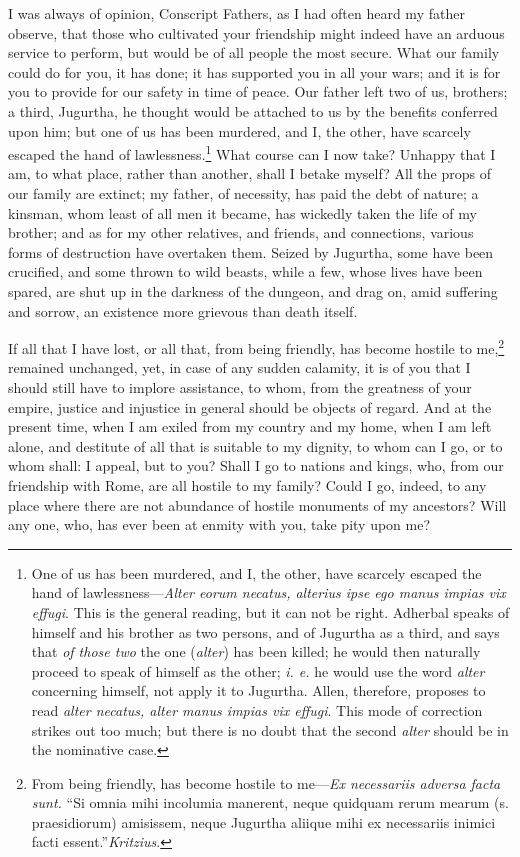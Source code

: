 I was always of opinion, Conscript Fathers, as I had often heard my
father observe, that those who cultivated your friendship might indeed
have an arduous service to perform, but would be of all people the
most secure. What our family could do for you, it has done; it has
supported you in all your wars; and it is for you to provide for our
safety in time of peace. Our father left two of us, brothers; a third,
Jugurtha, he thought would be attached to us by the benefits conferred
upon him; but one of us has been murdered, and I, the other, have
scarcely escaped the hand of lawlessness.\footnote{One of us has been murdered, and I, the other, have scarcely
escaped the hand of lawlessness—\emph{Alter eorum necatus, alterius ipse
ego manus impias vix effugi}. This is the general reading, but it can
not be right. Adherbal speaks of himself and his brother as two
persons, and of Jugurtha as a third, and says that \emph{of those two} the
one (\emph{alter}) has been killed; he would then naturally proceed to
speak of himself as the other; \emph{i. e.} he would use the word \emph{alter}
concerning himself, not apply it to Jugurtha. Allen, therefore,
proposes to read \emph{alter necatus, alter manus impias vix effugi}. This
mode of correction strikes out too much; but there is no doubt that
the second \emph{alter} should be in the nominative case.} What course can I now
take? Unhappy that I am, to what place, rather than another, shall I
betake myself? All the props of our family are extinct; my father, of
necessity, has paid the debt of nature; a kinsman, whom least of all
men it became, has wickedly taken the life of my brother; and as for
my other relatives, and friends, and connections, various forms of
destruction have overtaken them. Seized by Jugurtha, some have been
crucified, and some thrown to wild beasts, while a few, whose lives
have been spared, are shut up in the darkness of the dungeon, and drag
on, amid suffering and sorrow, an existence more grievous than death
itself.

If all that I have lost, or all that, from being friendly, has become
hostile to me,\footnote{From being friendly, has become hostile to me—\emph{Ex necessariis
adversa facta sunt.} ``Si omnia mihi incolumia manerent, neque quidquam
rerum mearum (s. praesidiorum) amisissem, neque Jugurtha aliique mihi
ex necessariis inimici facti essent.''\emph{Kritzius}.} remained unchanged, yet, in case of any sudden
calamity, it is of you that I should still have to implore assistance,
to whom, from the greatness of your empire, justice and injustice in
general should be objects of regard. And at the present time, when I
am exiled from my country and my home, when I am left alone, and
destitute of all that is suitable to my dignity, to whom can I go, or
to whom shall: I appeal, but to you? Shall I go to nations and kings,
who, from our friendship with Rome, are all hostile to my family?
Could I go, indeed, to any place where there are not abundance of
hostile monuments of my ancestors? Will any one, who, has ever been at
enmity with you, take pity upon me?

